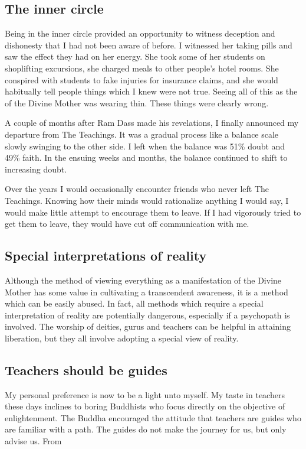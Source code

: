 \documentclass[a5paper,10pt,english]{book}
\begin{document}
\subsection{The inner circle}
\label{\detokenize{psychopaths:the-inner-circle}}
\sphinxAtStartPar
Being in the inner circle provided an opportunity to witness deception
and dishonesty that I had not been aware of before. I witnessed her
taking pills and saw the effect they had on her energy. She took some of
her students on shoplifting excursions, she charged meals to other
people’s hotel rooms. She conspired with students to fake injuries for
insurance claims, and she would habitually tell people things which I
knew were not true. Seeing all of this as the  of the Divine
Mother was wearing thin. These things were clearly wrong.

\sphinxAtStartPar
A couple of months after Ram Dass made his revelations, I finally
announced my departure from The Teachings. It was a gradual process like
a balance scale slowly swinging to the other side. I left when the
balance was 51\% doubt and 49\% faith. In the ensuing weeks and months,
the balance continued to shift to increasing doubt.

\sphinxAtStartPar
Over the years I would occasionally encounter friends who never left The
Teachings. Knowing how their minds would rationalize anything I would
say, I would make little attempt to encourage them to leave. If I had
vigorously tried to get them to leave, they would have cut off
communication with me.


\subsection{Special interpretations of reality}
\label{\detokenize{psychopaths:special-interpretations-of-reality}}
\sphinxAtStartPar
Although the method of viewing everything as a manifestation of the
Divine Mother has some value in cultivating a transcendent awareness, it
is a method which can be easily abused. In fact, all methods which
require a special interpretation of reality are potentially dangerous,
especially if a psychopath is involved. The worship of deities, gurus
and teachers can be helpful in attaining liberation, but they all
involve adopting a special view of reality.


\subsection{Teachers should be guides}
\label{\detokenize{psychopaths:teachers-should-be-guides}}
\sphinxAtStartPar
My personal preference is now to be a light unto myself. My taste in
teachers these days inclines to boring Buddhists who focus directly on
the objective of enlightenment. The Buddha encouraged the attitude that
teachers are guides who are familiar with a path. The guides do not make
the journey for us, but only advise us. From 
\end{document}
